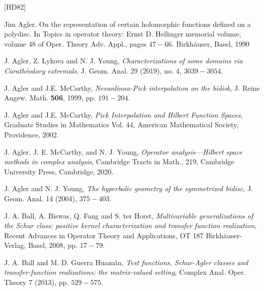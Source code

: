 \documentclass[12pt]{amsart}
\theoremstyle{definition}
\numberwithin{equation}{section}
\begin{document}
\begin{thebibliography}{[HD82]}




\normalsize
\baselineskip=17pt



	 Jim Agler. On the representation of certain holomorphic functions defined on a polydisc. In Topics in operator theory: Ernst D. Hellinger memorial volume, volume 48 of Oper. Theory
Adv. Appl., pages $47-66$. Birkh\"auser, Basel, 1990

 J. Agler, Z. Lykova and N. J. Young, \textit{Characterizations of some domains via Carathéodory extremals}, J. Geom. Anal. 29 (2019), no. 4, $3039-3054$.


 J. Agler and J.E. McCarthy, \textit{Nevanlinna-Pick interpolation on the bidisk}, J. Reine Angew. Math. \textbf{506}, 1999, pp. $191-204$.

 J. Agler and J.E. McCarthy, \textit{Pick Interpolation and Hilbert Function Spaces,} Graduate Studies in Mathematics Vol. 44, American Mathematical Society, Providence, 2002.

 J. Agler, J. E. McCarthy, and N. J. Young, \textit{Operator analysis—Hilbert space methods in complex analysis}, Cambridge Tracts in Math., 219, Cambridge University Press, Cambridge, 2020.

 J. Agler and N. J. Young, \textit{The hyperbolic geometry of the symmetrized bidisc}, J. Geom. Anal. 14 (2004), $375-403$.


 J. A. Ball, A. Biswas, Q. Fang and S. ter Horst, \textit{Multivariable generalizations of the Schur class: positive kernel characterization and transfer function realization,} Recent Advances in Operator Theory and Applications, OT 187 Birkh\"auser-Verlag, Basel, 2008, pp. $17-79$.

 J. A. Ball and M. D. Guerra Huam\'an, \textit{Test functions, Schur-Agler classes and transfer-function realizations: the matrix-valued setting,} Complex Anal. Oper. Theory 7 (2013), pp. $529-575$.



\end{thebibliography}
\end{document}

